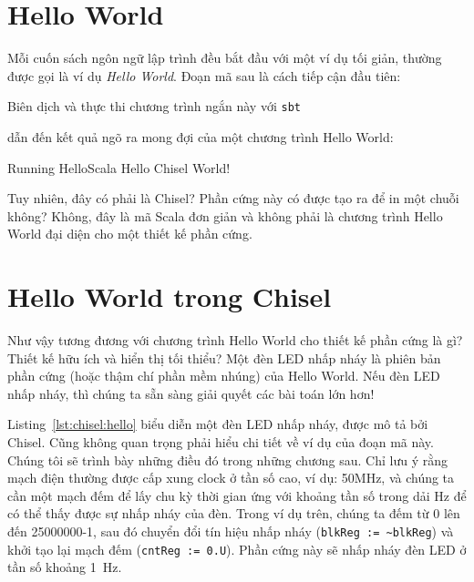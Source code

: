 \documentclass[%
    10pt,
    headinclude, footexclude,
    openright, %
    notitlepage,
    cleardoubleempty,
    headsepline,
    pointlessnumbers,
    bibtotoc, idxtotoc,
    ]{scrbook}
\newcommand{\code}[1]{{\small{\texttt{#1}}}}
\begin{document}
\section{Hello World}

Mỗi cuốn sách ngôn ngữ lập trình đều bắt đầu với một ví dụ tối giản, thường được gọi là ví dụ \emph{Hello World}. Đoạn mã sau là cách tiếp cận đầu tiên:


\noindent Biên dịch và thực thi chương trình ngắn này với \code{sbt}


\noindent dẫn đến kết quả ngõ ra mong đợi của một chương trình Hello World:

\begin{chisel}
[info] Running HelloScala
Hello Chisel World!
\end{chisel}

\noindent Tuy nhiên, đây có phải là Chisel? Phần cứng này có được tạo ra để in một chuỗi không? Không, đây là mã Scala đơn giản và không phải là chương trình Hello World đại diện cho một thiết kế phần cứng.

\section{Hello World trong Chisel}

Như vậy tương đương với chương trình Hello World cho thiết kế phần cứng là gì?
Thiết kế hữu ích và hiển thị tối thiểu? Một đèn LED nhấp nháy là phiên bản phần cứng (hoặc thậm chí phần mềm nhúng) của Hello World. Nếu đèn LED nhấp nháy, thì chúng ta sẵn sàng giải quyết các bài toán lớn hơn!


Listing~\ref{lst:chisel:hello} biểu diễn một đèn LED nhấp nháy, được mô tả bởi Chisel.
Cũng không quan trọng phải hiểu chi tiết về ví dụ của đoạn mã này. Chúng tôi sẽ trình bày những điều đó trong những chương sau. Chỉ lưu ý rằng mạch điện thường được cấp xung clock ở tần số cao, ví dụ: 50MHz, và chúng ta cần một mạch đếm để lấy chu kỳ thời gian ứng với khoảng tần số trong dải Hz để có thể thấy được sự nhấp nháy của đèn. Trong ví dụ trên, chúng ta đếm từ 0 lên đến 25000000-1, sau đó chuyển đổi tín hiệu nhấp nháy 
(\code{blkReg := \textasciitilde blkReg}) và khởi tạo lại mạch đếm (\code{cntReg := 0.U}).
Phần cứng này sẽ nhấp nháy đèn LED ở tần số khoảng 1~Hz.
\end{document}
